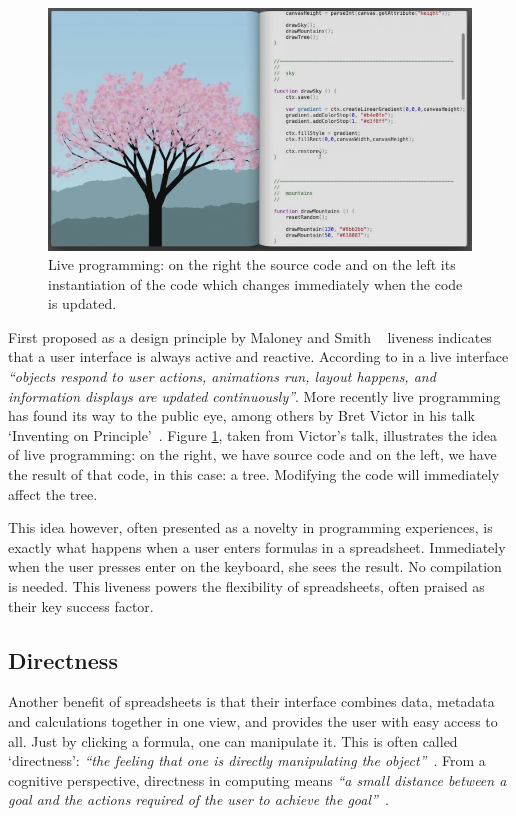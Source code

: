 \documentclass[conference]{IEEEtran}
\begin{document}
\begin{figure}
  \begin{center}
  \includegraphics[width=\columnwidth]{fig/bret.png}
  \caption{Live programming: on the right the source code and on the left its instantiation of the code which changes immediately when the code is updated.}
  \label{fig:bret}
  \end{center}
\end{figure} 

First proposed as a design principle by Maloney and Smith ~\cite{maloney_directness_1995} liveness indicates that a user interface is always active and reactive. According to \cite{maloney_directness_1995} in a live interface \emph{``objects respond to user actions, animations run, layout happens, and information displays are updated continuously''}. More recently  live programming has found its way to the public eye, among others by Bret Victor in his talk `Inventing on Principle'~\cite{Victor2012}. Figure \ref{fig:bret}, taken from Victor's talk, illustrates the idea of live programming: on the right, we have source code and on the left, we have the result of that code, in this case: a tree. Modifying the code will immediately affect the tree.
 
This idea however, often presented as a novelty in programming experiences, is exactly what happens when a user enters formulas in a spreadsheet. Immediately when the user presses enter on the keyboard, she sees the result. No compilation is needed. This liveness powers the flexibility of spreadsheets, often praised as their key success factor.

\subsection{Directness}
Another benefit of spreadsheets is that their interface combines data, metadata and calculations together in one view, and provides the user with easy access to all. Just by clicking a formula, one can manipulate it. This is often called `directness': \emph{``the feeling
that one is directly manipulating the object''}~\cite{shneiderman_direct_1983}. From a cognitive perspective, directness in computing means \emph{``a small distance between a goal and the actions required of the user to achieve the goal''}~\cite{burnett_visual_2001}.
\end{document}
